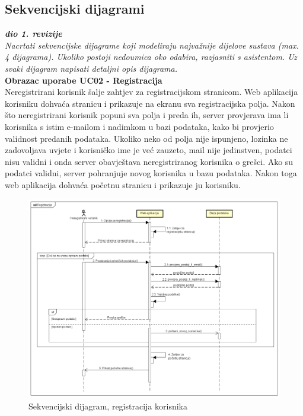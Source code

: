 			\subsection{Sekvencijski dijagrami}
				
				\textbf{\textit{dio 1. revizije}}\\
				
				\textit{Nacrtati sekvencijske dijagrame koji modeliraju najvažnije dijelove sustava (max. 4 dijagrama). Ukoliko postoji nedoumica oko odabira, razjasniti s asistentom. Uz svaki dijagram napisati detaljni opis dijagrama.}\\
				
				
				
				\textbf{Obrazac uporabe UC02 - Registracija}\\
				
				Neregistrirani korisnik šalje zahtjev za registracijskom stranicom. Web aplikacija korisniku dohvaća stranicu i prikazuje na ekranu sva registracijska polja. Nakon što neregistrirani korisnik popuni sva polja i preda ih, server provjerava ima li korisnika s istim e-mailom i nadimkom u bazi podataka, kako bi provjerio validnost predanih podataka. Ukoliko neko od polja nije ispunjeno, lozinka ne zadovoljava uvjete i korisničko ime je već zauzeto, mail nije jedinstven, podatci nisu validni i onda server obavještava neregistriranog korisnika o grešci. Ako su podatci validni, server pohranjuje novog korisnika u bazu podataka. Nakon toga web aplikacija dohvaća početnu stranicu i prikazuje ju korisniku.
				
				\begin{figure}[H]
					\includegraphics[width=\textwidth]{dijagrami/SeqDiagram1.PNG} 
					\caption{Sekvencijski dijagram, registracija korisnika}
					\label{fig:SeqDiagram1}
				\end{figure}
				
